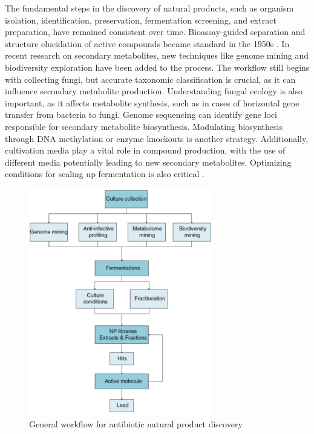 The fundamental steps in the discovery of natural products, such as organism isolation, identification, preservation, fermentation screening, and extract preparation, have remained consistent over time. Bioassay-guided separation and structure elucidation of active compounds became standard in the 1950s \cite{Karwehl2016}. In recent research on secondary metabolites, new techniques like genome mining and biodiversity exploration have been added to the process. The workflow still begins with collecting fungi, but accurate taxonomic classification is crucial, as it can influence secondary metabolite production. Understanding fungal ecology is also important, as it affects metabolite synthesis, such as in cases of horizontal gene transfer from bacteria to fungi. Genome sequencing can identify gene loci responsible for secondary metabolite biosynthesis. Modulating biosynthesis through DNA methylation or enzyme knockouts is another strategy. Additionally, cultivation media play a vital role in compound production, with the use of different media potentially leading to new secondary metabolites. Optimizing conditions for scaling up fermentation is also critical \cite{Karwehl2016}.


\begin{figure}[H]
    \centering
    \includegraphics[width=8cm]{images/introduction/intro-flow-chart.jpg}
    \caption{General workflow for antibiotic natural product discovery \cite{Karwehl2016}}
    \label{}
\end{figure}


